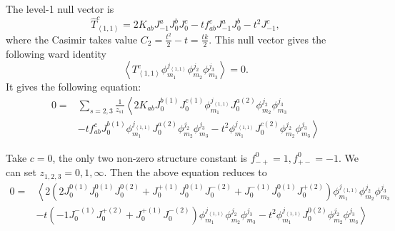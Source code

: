 \documentclass[10pt,a4paper]{article}
\numberwithin{equation}{section}
\newcommand{\vev}[1]{\left< #1 \right>}
\begin{document}
The level-1 null vector is 
\begin{equation}
    \hat{T}^{c}_{\vev{1,1}} = 2 K_{ab} J^{a}_{-1} J^{b}_{0} J^{c}_{0} - t f^{c}_{ab} J^{a}_{-1} J^{b}_{0} - t^{2} J^{c}_{-1},
\end{equation}
where the Casimir takes value $C_{2} = \frac{t^{2}}{2} - t = \frac{tk}{2}$. This null vector gives the following ward identity 
\begin{equation}
    \vev{T^{c}_{\vev{1,1}} \phi^{j_{\vev{1,1}}}_{m_{1}} \phi^{j_{2}}_{m_{2}} \phi^{j_{3}}_{m_{3}}} = 0.
\end{equation}
It gives the following equation:
\begin{equation}
    \begin{aligned}
    0= &\sum_{s=2,3} \frac{1}{z_{s1}} \left\langle 2K_{ab} J^{b(1)}_{0}J^{c(1)}_{0} \phi^{j_{\vev{1,1}}}_{m_{1}} J^{a(2)}_{0} \phi^{j_{2}}_{m_{2}}\phi^{j_{3}}_{m_{3}} \right. \\
    & \left. -t f^{c}_{ab} J^{b(1)}_{0} \phi^{j_{\vev{1,1}}}_{m_{1}} J^{a(2)}_{0}\phi^{j_{2}}_{m_{2}}\phi^{j_{3}}_{m_{3}} - t^{2} \phi^{j_{\vev{1,1}}}_{m_{1}} J^{c(2)}_{0} \phi^{j_{2}}_{m_{2}}\phi^{j_{3}}_{m_{3}}  \right\rangle
    \end{aligned}
\end{equation}

Take $c = 0$, the only two non-zero structure constant is $f^{0}_{-+} = 1, f^{0}_{+-} = -1$. We can set $z_{1,2,3} = 0,1,\infty$. Then 
the above equation reduces to 
\begin{equation}\begin{aligned}
    0= & \left\langle 2 \left(2 J^{0(1)}_{0}J^{0(1)}_{0} J^{0(2)}_{0} + J^{+(1)}_{0}J^{0(1)}_{0} J^{-(2)}_{0} + J^{-(1)}_{0}J^{0(1)}_{0} J^{+(2)}_{0} \right) \phi^{j_{\vev{1,1}}}_{m_{1}} \phi^{j_{2}}_{m_{2}}\phi^{j_{3}}_{m_{3}} \right. \\
    & \left. -t \left(-1 J^{-(1)}_{0}J^{+(2)}_{0} + J^{+(1)}_{0}J^{-(2)}_{0} \right) \phi^{j_{\vev{1,1}}}_{m_{1}} \phi^{j_{2}}_{m_{2}}\phi^{j_{3}}_{m_{3}} - t^{2} \phi^{j_{\vev{1,1}}}_{m_{1}} J^{0(2)}_{0} \phi^{j_{2}}_{m_{2}}\phi^{j_{3}}_{m_{3}}  \right\rangle
\end{aligned}\end{equation}
\end{document}
